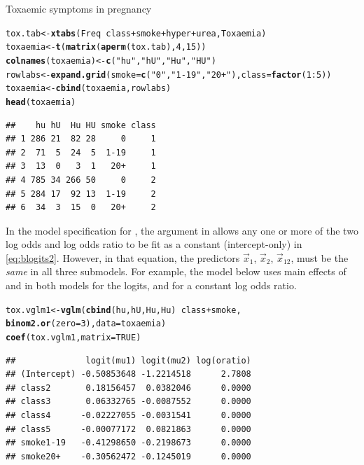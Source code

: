 \documentclass[11pt]{book}\usepackage[]{graphicx}\usepackage[]{color}
\makeatletter
\newcommand{\hlnum}[1]{\textcolor[rgb]{0.686,0.059,0.569}{#1}}%
\newcommand{\hlstr}[1]{\textcolor[rgb]{0.192,0.494,0.8}{#1}}%
\newcommand{\hlopt}[1]{\textcolor[rgb]{0,0,0}{#1}}%
\newcommand{\hlstd}[1]{\textcolor[rgb]{0.345,0.345,0.345}{#1}}%
\newcommand{\hlkwb}[1]{\textcolor[rgb]{0.69,0.353,0.396}{#1}}%
\newcommand{\hlkwc}[1]{\textcolor[rgb]{0.333,0.667,0.333}{#1}}%
\newcommand{\hlkwd}[1]{\textcolor[rgb]{0.737,0.353,0.396}{\textbf{#1}}}%
\newenvironment{kframe}{%
 \def\at@end@of@kframe{}%
 \ifinner\ifhmode%
  \def\at@end@of@kframe{\end{minipage}}%
  \begin{minipage}{\columnwidth}%
 \fi\fi%
 \def\FrameCommand##1{\hskip\@totalleftmargin \hskip-\fboxsep
 \colorbox{shadecolor}{##1}\hskip-\fboxsep
     \hskip-\linewidth \hskip-\@totalleftmargin \hskip\columnwidth}%
 \MakeFramed {\advance\hsize-\width
   \@totalleftmargin\z@ \linewidth\hsize
   \@setminipage}}%
 {\par\unskip\endMakeFramed%
 \at@end@of@kframe}
\newenvironment{knitrout}{}{} %
\renewenvironment{knitrout}{\small\renewcommand{\baselinestretch}{.85}}{} %
\makeatother
\begin{document}
\begin{Example}[toxaemia]{Toxaemic symptoms in pregnancy}
\begin{knitrout}
\color{fgcolor}\begin{kframe}
\begin{alltt}
\hlstd{tox.tab} \hlkwb{<-} \hlkwd{xtabs}\hlstd{(Freq}\hlopt{~}\hlstd{class} \hlopt{+} \hlstd{smoke} \hlopt{+} \hlstd{hyper} \hlopt{+} \hlstd{urea, Toxaemia)}
\hlstd{toxaemia} \hlkwb{<-} \hlkwd{t}\hlstd{(}\hlkwd{matrix}\hlstd{(}\hlkwd{aperm}\hlstd{(tox.tab),} \hlnum{4}\hlstd{,} \hlnum{15}\hlstd{))}
\hlkwd{colnames}\hlstd{(toxaemia)} \hlkwb{<-} \hlkwd{c}\hlstd{(}\hlstr{"hu"}\hlstd{,} \hlstr{"hU"}\hlstd{,} \hlstr{"Hu"}\hlstd{,} \hlstr{"HU"}\hlstd{)}
\hlstd{rowlabs} \hlkwb{<-} \hlkwd{expand.grid}\hlstd{(}\hlkwc{smoke}\hlstd{=}\hlkwd{c}\hlstd{(}\hlstr{"0"}\hlstd{,} \hlstr{"1-19"}\hlstd{,} \hlstr{"20+"}\hlstd{),} \hlkwc{class}\hlstd{=}\hlkwd{factor}\hlstd{(}\hlnum{1}\hlopt{:}\hlnum{5}\hlstd{))}
\hlstd{toxaemia} \hlkwb{<-} \hlkwd{cbind}\hlstd{(toxaemia, rowlabs)}
\hlkwd{head}\hlstd{(toxaemia)}
\end{alltt}
\begin{verbatim}
##    hu hU  Hu HU smoke class
## 1 286 21  82 28     0     1
## 2  71  5  24  5  1-19     1
## 3  13  0   3  1   20+     1
## 4 785 34 266 50     0     2
## 5 284 17  92 13  1-19     2
## 6  34  3  15  0   20+     2
\end{verbatim}
\end{kframe}
\end{knitrout}
In the model specification for , the  argument in
 allows any one or more of the two log odds and log odds
ratio to be fit as a constant (intercept-only) in \eqref{eq:blogits2}.
However, in that equation, the predictors $\vec{x}_1$, $\vec{x}_2$, $\vec{x}_{12}$,
must be the \emph{same} in all three submodels.  For example, the model
 below uses main effects of  and 
in both models for the logits, and  for a constant
log odds ratio.
\begin{knitrout}
\color{fgcolor}\begin{kframe}
\begin{alltt}
\hlstd{tox.vglm1} \hlkwb{<-} \hlkwd{vglm}\hlstd{(}\hlkwd{cbind}\hlstd{(hu, hU, Hu, Hu)} \hlopt{~} \hlstd{class} \hlopt{+} \hlstd{smoke,}
                  \hlkwd{binom2.or}\hlstd{(}\hlkwc{zero}\hlstd{=}\hlnum{3}\hlstd{),} \hlkwc{data}\hlstd{=toxaemia)}
\hlkwd{coef}\hlstd{(tox.vglm1,} \hlkwc{matrix}\hlstd{=}\hlnum{TRUE}\hlstd{)}
\end{alltt}
\begin{verbatim}
##              logit(mu1) logit(mu2) log(oratio)
## (Intercept) -0.50853648 -1.2214518      2.7808
## class2       0.18156457  0.0382046      0.0000
## class3       0.06332765 -0.0087552      0.0000
## class4      -0.02227055 -0.0031541      0.0000
## class5      -0.00077172  0.0821863      0.0000
## smoke1-19   -0.41298650 -0.2198673      0.0000
## smoke20+    -0.30562472 -0.1245019      0.0000
\end{verbatim}
\end{kframe}
\end{knitrout}


\end{Example}
\end{document}
